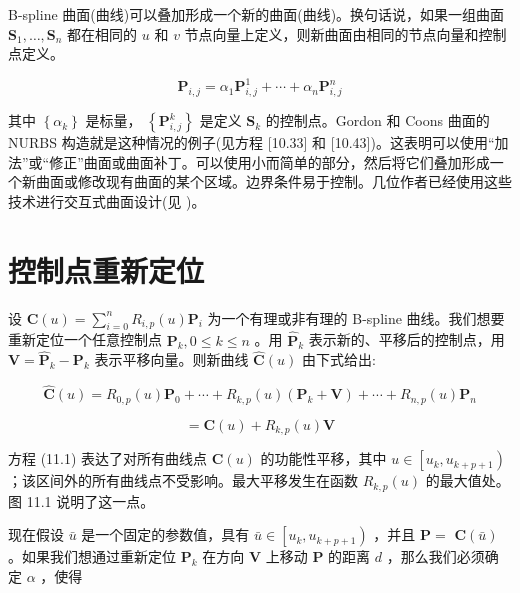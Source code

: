 \documentclass[../main.tex]{subfiles}
\begin{document}
B-spline 曲面(曲线)可以叠加形成一个新的曲面(曲线)。换句话说，如果一组曲面 \({\mathbf{S}}_{1},\ldots ,{\mathbf{S}}_{n}\) 都在相同的 \(u\) 和 \(v\) 节点向量上定义，则新曲面由相同的节点向量和控制点定义。

\[
{\mathbf{P}}_{i,j} = {\alpha }_{1}{\mathbf{P}}_{i,j}^{1} + \cdots  + {\alpha }_{n}{\mathbf{P}}_{i,j}^{n}
\]

其中 \(\left\{  {\alpha }_{k}\right\}\) 是标量， \(\left\{  {\mathbf{P}}_{i,j}^{k}\right\}\) 是定义 \({\mathbf{S}}_{k}\) 的控制点。Gordon 和 Coons 曲面的 NURBS 构造就是这种情况的例子(见方程 [10.33] 和 [10.43])。这表明可以使用“加法”或“修正”曲面或曲面补丁。可以使用小而简单的部分，然后将它们叠加形成一个新曲面或修改现有曲面的某个区域。边界条件易于控制。几位作者已经使用这些技术进行交互式曲面设计(见 \cite{Fors88,Mats92,Welc92})。



\section{控制点重新定位}

设 \(\mathbf{C}\left( u\right)  = \mathop{\sum }\limits_{{i = 0}}^{n}{R}_{i,p}\left( u\right) {\mathbf{P}}_{i}\) 为一个有理或非有理的 B-spline 曲线。我们想要重新定位一个任意控制点 \({\mathbf{P}}_{k},0 \leq  k \leq  n\) 。用 \({\widehat{\mathbf{P}}}_{k}\) 表示新的、平移后的控制点，用 \(\mathbf{V} = {\widehat{\mathbf{P}}}_{k} - {\mathbf{P}}_{k}\) 表示平移向量。则新曲线 \(\widehat{\mathbf{C}}\left( u\right)\) 由下式给出:

\[
\widehat{\mathbf{C}}\left( u\right)  = {R}_{0,p}\left( u\right) {\mathbf{P}}_{0} + \cdots  + {R}_{k,p}\left( u\right) \left( {{\mathbf{P}}_{k} + \mathbf{V}}\right)  + \cdots  + {R}_{n,p}\left( u\right) {\mathbf{P}}_{n}
\]

\[
= \mathbf{C}\left( u\right)  + {R}_{k,p}\left( u\right) \mathbf{V} \tag{11.1}
\]

方程 (11.1) 表达了对所有曲线点 \(\mathbf{C}\left( u\right)\) 的功能性平移，其中 \(u \in  \left\lbrack  {{u}_{k},{u}_{k + p + 1}}\right)\) ；该区间外的所有曲线点不受影响。最大平移发生在函数 \({R}_{k,p}\left( u\right)\) 的最大值处。图 11.1 说明了这一点。

现在假设 \(\bar{u}\) 是一个固定的参数值，具有 \(\bar{u} \in  \left\lbrack  {{u}_{k},{u}_{k + p + 1}}\right)\) ，并且 \(\mathbf{P} =\)  \(\mathbf{C}\left( \bar{u}\right)\) 。如果我们想通过重新定位 \({\mathbf{P}}_{k}\) 在方向 \(\mathbf{V}\) 上移动 \(\mathbf{P}\) 的距离 \(d\) ，那么我们必须确定 \(\alpha\) ，使得
\end{document}
